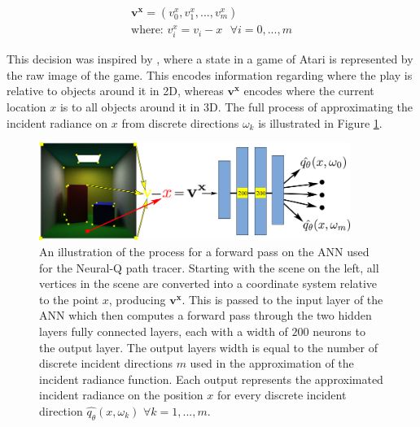 \documentclass[../dissertation.tex]{subfiles}
\begin{document}
\begin{gather*}
\mathbf{v^x} = (v^x_0, v^x_1, ..., v^x_m)\\
\text{where: } v^x_i = v_i - x \ \ \ \forall i = 0, ..., m \nonumber
\end{gather*}

This decision was inspired by \cite{mnih2013playing}, where a state in a game of Atari is represented by the raw image of the game. This encodes information regarding where the play is relative to objects around it in 2D, whereas $\mathbf{v^x}$ encodes where the current location $x$ is to all objects around it in 3D. The full process of approximating the incident radiance on $x$ from discrete directions $\omega_k$ is illustrated in Figure \ref{fig:nn_radiance_estimate_illustration}.\\

\begin{figure}[h]
\centering
\includegraphics[width=0.9\textwidth]{images/fwd_pass_process.png}   
\caption{An illustration of the process for a forward pass on the ANN used for the Neural-Q path tracer. Starting with the scene on the left, all vertices in the scene are converted into a coordinate system relative to the point $x$, producing $\mathbf{v^x}$. This is passed to the input layer of the ANN which then computes a forward pass through the two hidden layers fully connected layers, each with a width of $200$ neurons to the output layer. The output layers width is equal to the number of discrete incident directions $m$ used in the approximation of the incident radiance function. Each output represents the approximated incident radiance on the position $x$ for every discrete incident direction $\hat{q_\theta}(x, \omega_k)$ $\forall k = 1, ..., m$.}
\label{fig:nn_radiance_estimate_illustration}
\end{figure}
\end{document}
